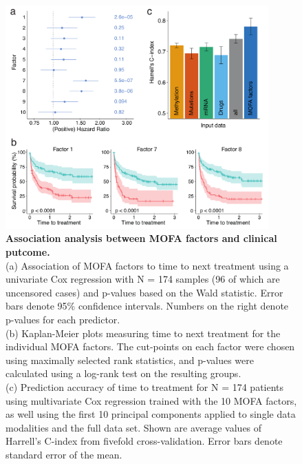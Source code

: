 
\begin{figure}[H]
	\centering 	
	\includegraphics[width=0.9\textwidth]{MOFA_CLL_Cox}
	\caption{
	\textbf{Association analysis between MOFA factors and clinical putcome.}\\
	(a) Association of MOFA factors to time to next treatment using a univariate Cox regression with N = 174 samples (96 of which are uncensored cases) and p-values based on the Wald statistic. Error bars denote 95\% confidence intervals. Numbers on the right denote p-values for each predictor.\\
	(b) Kaplan-Meier plots measuring time to next treatment for the individual MOFA factors. The cut-points on each factor were chosen using maximally selected rank statistics, and p-values were calculated using a log-rank test on the resulting groups.\\
	(c) Prediction accuracy of time to treatment for N = 174 patients using multivariate Cox regression trained with the 10 MOFA factors, as well using the first 10 principal components applied to single data modalities and the full data set. Shown are average values of Harrell's C-index from fivefold cross-validation. Error bars denote standard error of the mean.
	}
	\label{fig:MOFA_CLL_Cox}
\end{figure}


